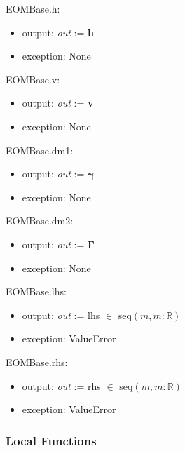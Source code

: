 \documentclass[12pt, titlepage]{article}
\begin{document}
\noindent EOMBase.h:
\begin{itemize}
	\item output: \textit{out} := \textbf{h}
	\item exception: None
\end{itemize}

\noindent EOMBase.v:
\begin{itemize}
	\item output: \textit{out} := \textbf{v}
	\item exception: None
\end{itemize}

\noindent EOMBase.dm1:
\begin{itemize}
	\item output: \textit{out} := $\boldsymbol{\gamma}$
	\item exception: None
\end{itemize}

\noindent EOMBase.dm2:
\begin{itemize}
	\item output: \textit{out} := $\boldsymbol{\Gamma}$
	\item exception: None
\end{itemize}

\noindent EOMBase.lhs:
\begin{itemize}
	\item output: \textit{out} := lhs $\in$ seq$(m,m:\mathbb{R})$
	\item exception: ValueError
\end{itemize}

\noindent EOMBase.rhs:
\begin{itemize}
	\item output: \textit{out} := rhs $\in$ seq$(m,m:\mathbb{R})$
	\item exception: ValueError
\end{itemize}

\subsubsection{Local Functions}
\end{document}
